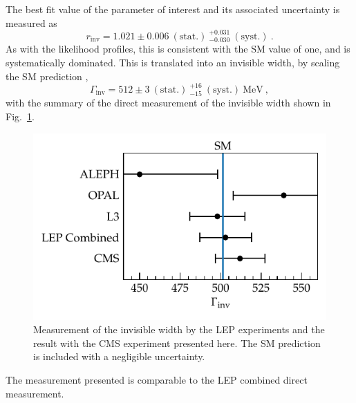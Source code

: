 The best fit value of the parameter of interest and its associated uncertainty is measured as
%
\begin{equation}
    r_{\mathrm{inv}} = 1.021\pm 0.006\ (\mathrm{stat.})\ ^{+0.031}_{-0.030}\ (\mathrm{syst.})\ .
\end{equation}
%
As with the likelihood profiles, this is consistent with the SM value of one, and is systematically dominated. This is translated into an invisible width, by scaling the SM prediction \cite{PhysRevD.98.030001},
%
\begin{equation}
    \Gamma_{\mathrm{inv}} = 512 \pm 3\ (\mathrm{stat.})\ ^{+16}_{-15}\ (\mathrm{syst.})\ \mathrm{MeV}\ ,
\end{equation}
%
with the summary of the direct measurement of the invisible width shown in Fig.~\ref{fig:finalfit-zinv}.
%
\begin{figure}
    \centering
    \includegraphics{chapters/043_results/images/finalfit-zinv.pdf}
    \caption[Summary of the invisible width measurements.]{
        Measurement of the \PZ invisible width by the LEP experiments and the result with the CMS experiment presented here. The SM prediction is included with a negligible uncertainty.
    }
    \label{fig:finalfit-zinv}
\end{figure}
%
The measurement presented is comparable to the LEP combined direct measurement.
